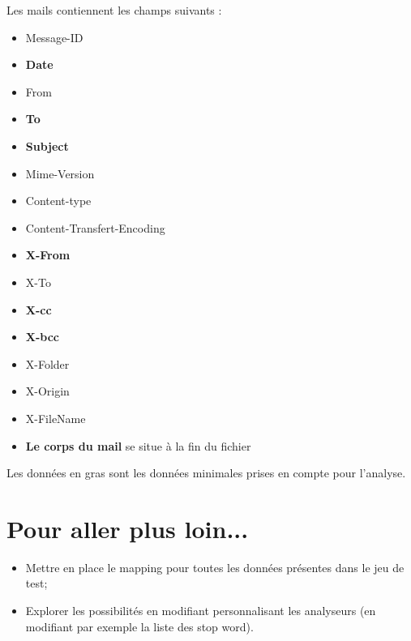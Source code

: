 \documentclass[11pt,letterpaper]{article}
\begin{document}
	Les mails contiennent les champs suivants :
	\begin{itemize}
		\item Message-ID
		\item \textbf{Date}
		\item From
		\item \textbf{To}
		\item \textbf{Subject}
		\item Mime-Version
		\item Content-type
		\item Content-Transfert-Encoding
		\item \textbf{X-From}
		\item X-To
		\item \textbf{X-cc}
		\item \textbf{X-bcc}
		\item X-Folder
		\item X-Origin
		\item X-FileName
		\item \textbf{Le corps du mail} se situe à la fin du fichier
	\end{itemize}
Les données en gras sont les données minimales prises en compte pour l'analyse.
	\section*{Pour aller plus loin...}
	\begin{itemize}
		\item Mettre en place le mapping pour toutes les données présentes dans le jeu de test;
		\item Explorer les possibilités en modifiant personnalisant les analyseurs (en modifiant par exemple la liste des stop word).
	\end{itemize}
\end{document}
